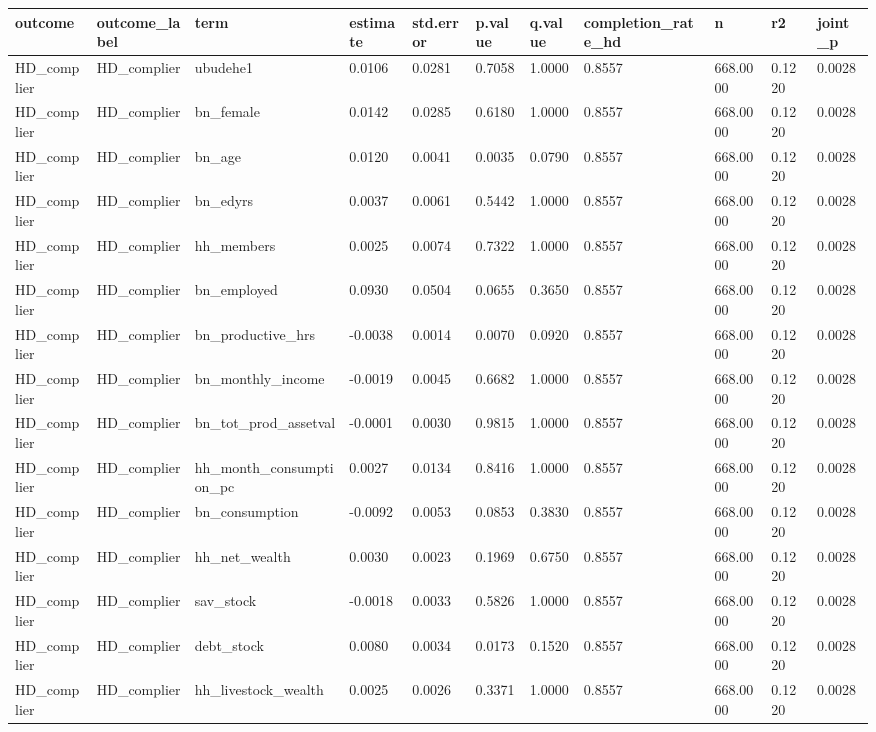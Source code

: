 \begin{tabular}{lllllllllll}
\toprule
outcome & outcome\_label & term & estimate & std.error & p.value & q.value & completion\_rate\_hd & n & r2 & joint\_p
 \\
\midrule
HD\_complier & HD\_complier & ubudehe1 & 0.0106 & 0.0281 & 0.7058 & 1.0000 & 0.8557 & 668.0000 & 0.1220 & 0.0028 \\
HD\_complier & HD\_complier & bn\_female & 0.0142 & 0.0285 & 0.6180 & 1.0000 & 0.8557 & 668.0000 & 0.1220 & 0.0028 \\
HD\_complier & HD\_complier & bn\_age & 0.0120 & 0.0041 & 0.0035 & 0.0790 & 0.8557 & 668.0000 & 0.1220 & 0.0028 \\
HD\_complier & HD\_complier & bn\_edyrs & 0.0037 & 0.0061 & 0.5442 & 1.0000 & 0.8557 & 668.0000 & 0.1220 & 0.0028 \\
HD\_complier & HD\_complier & hh\_members & 0.0025 & 0.0074 & 0.7322 & 1.0000 & 0.8557 & 668.0000 & 0.1220 & 0.0028 \\
HD\_complier & HD\_complier & bn\_employed & 0.0930 & 0.0504 & 0.0655 & 0.3650 & 0.8557 & 668.0000 & 0.1220 & 0.0028 \\
HD\_complier & HD\_complier & bn\_productive\_hrs & -0.0038 & 0.0014 & 0.0070 & 0.0920 & 0.8557 & 668.0000 & 0.1220 & 0.0028 \\
HD\_complier & HD\_complier & bn\_monthly\_income & -0.0019 & 0.0045 & 0.6682 & 1.0000 & 0.8557 & 668.0000 & 0.1220 & 0.0028 \\
HD\_complier & HD\_complier & bn\_tot\_prod\_assetval & -0.0001 & 0.0030 & 0.9815 & 1.0000 & 0.8557 & 668.0000 & 0.1220 & 0.0028 \\
HD\_complier & HD\_complier & hh\_month\_consumption\_pc & 0.0027 & 0.0134 & 0.8416 & 1.0000 & 0.8557 & 668.0000 & 0.1220 & 0.0028 \\
HD\_complier & HD\_complier & bn\_consumption & -0.0092 & 0.0053 & 0.0853 & 0.3830 & 0.8557 & 668.0000 & 0.1220 & 0.0028 \\
HD\_complier & HD\_complier & hh\_net\_wealth & 0.0030 & 0.0023 & 0.1969 & 0.6750 & 0.8557 & 668.0000 & 0.1220 & 0.0028 \\
HD\_complier & HD\_complier & sav\_stock & -0.0018 & 0.0033 & 0.5826 & 1.0000 & 0.8557 & 668.0000 & 0.1220 & 0.0028 \\
HD\_complier & HD\_complier & debt\_stock & 0.0080 & 0.0034 & 0.0173 & 0.1520 & 0.8557 & 668.0000 & 0.1220 & 0.0028 \\
HD\_complier & HD\_complier & hh\_livestock\_wealth & 0.0025 & 0.0026 & 0.3371 & 1.0000 & 0.8557 & 668.0000 & 0.1220 & 0.0028 \\

\end{tabular}
